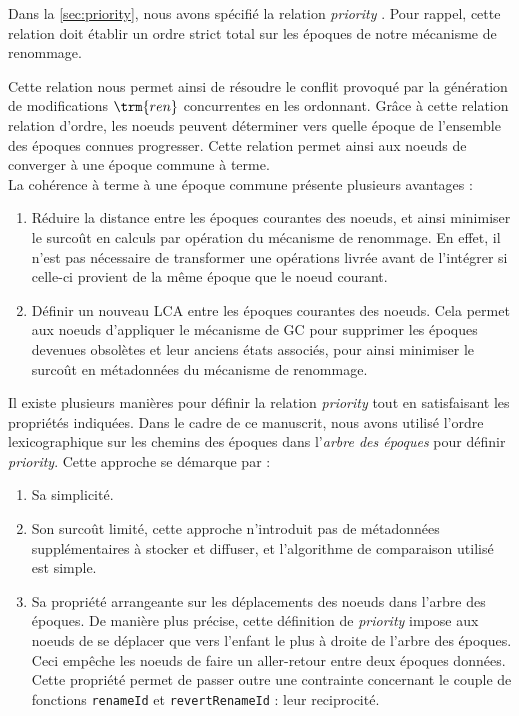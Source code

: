 \label{sec:alternative-priority}

Dans la \autoref{sec:priority}, nous avons spécifié la relation \emph{priority} .
Pour rappel, cette relation doit établir un ordre strict total sur les époques de notre mécanisme de renommage.

Cette relation nous permet ainsi de résoudre le conflit provoqué par la génération de modifications $\trm{ren}$ concurrentes en les ordonnant.
Grâce à cette relation relation d'ordre, les noeuds peuvent déterminer vers quelle époque de l'ensemble des époques connues progresser.
Cette relation permet ainsi aux noeuds de converger à une époque commune à terme.\\

La cohérence à terme à une époque commune présente plusieurs avantages :
\begin{enumerate}
    \item Réduire la distance entre les époques courantes des noeuds, et ainsi minimiser le surcoût en calculs par opération du mécanisme de renommage.
        En effet, il n'est pas nécessaire de transformer une opérations livrée avant de l'intégrer si celle-ci provient de la même époque que le noeud courant.
    \item Définir un nouveau \acf{LCA} entre les époques courantes des noeuds.
        Cela permet aux noeuds d'appliquer le mécanisme de \ac{GC} pour supprimer les époques devenues obsolètes et leur anciens états associés, pour ainsi minimiser le surcoût en métadonnées du mécanisme de renommage.
\end{enumerate}

Il existe plusieurs manières pour définir la relation \emph{priority} tout en satisfaisant les propriétés indiquées.
Dans le cadre de ce manuscrit, nous avons utilisé l'ordre lexicographique sur les chemins des époques dans l'\emph{arbre des époques} pour définir \emph{priority}.
Cette approche se démarque par :
\begin{enumerate}
    \item Sa simplicité.
    \item Son surcoût limité, \ie cette approche n'introduit pas de métadonnées supplémentaires à stocker et diffuser, et l'algorithme de comparaison utilisé est simple.
    \item Sa propriété arrangeante sur les déplacements des noeuds dans l'arbre des époques.
        De manière plus précise, cette définition de \emph{priority} impose aux noeuds de se déplacer que vers l'enfant le plus à droite de l'arbre des époques.
        Ceci empêche les noeuds de faire un aller-retour entre deux époques données.
        Cette propriété permet de passer outre une contrainte concernant le couple de fonctions \texttt{renameId} et \texttt{revertRenameId} : leur reciprocité.
\end{enumerate}

